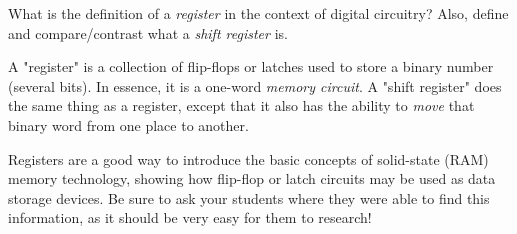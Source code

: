 

What is the definition of a {\it register} in the context of digital circuitry?  Also, define and compare/contrast what a {\it shift register} is.







A "register" is a collection of flip-flops or latches used to store a binary number (several bits).  In essence, it is a one-word {\it memory circuit}.  A "shift register" does the same thing as a register, except that it also has the ability to {\it move} that binary word from one place to another.







Registers are a good way to introduce the basic concepts of solid-state (RAM) memory technology, showing how flip-flop or latch circuits may be used as data storage devices.  Be sure to ask your students where they were able to find this information, as it should be very easy for them to research!




